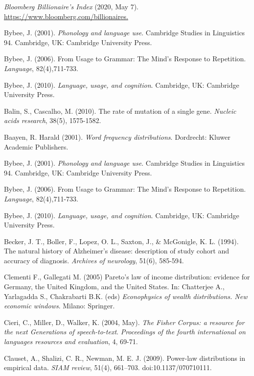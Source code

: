 \documentclass[12pt]{article}
\begin{document}
\begin{thebibliography}{50}

\emph{Bloomberg Billionaire's Index} (2020, May 7). \\
\url{https://www.bloomberg.com/billionaires.} 

Bybee, J. (2001).  \emph{Phonology and language use}. Cambridge Studies in Linguistics 94. Cambridge, UK: Cambridge University Press.

Bybee, J. (2006).  From Usage to Grammar: The Mind's Response to Repetition. \emph{Language}, 82(4),711-733.

Bybee, J. (2010).  \emph{Language, usage, and cognition}. Cambridge, UK: Cambridge University Press.

Balin, S., Cascalho, M. (2010). The rate of mutation of a single gene. \emph{Nucleic acids research}, 38(5), 1575-1582.

Baayen, R. Harald (2001).  \emph{Word frequency distributions}. Dordrecht: Kluwer Academic Publishers.

Bybee, J. (2001).  \emph{Phonology and language use}. Cambridge Studies in Linguistics 94. Cambridge, UK: Cambridge University Press.

Bybee, J. (2006).  From Usage to Grammar: The Mind's Response to Repetition. \emph{Language}, 82(4),711-733.

Bybee, J. (2010).  \emph{Language, usage, and cognition}. Cambridge, UK: Cambridge University Press.

Becker, J. T., Boller, F., Lopez, O. L., Saxton, J., \& McGonigle, K. L. (1994). The natural history of Alzheimer's disease: description of study cohort and accuracy of diagnosis. \emph{Archives of neurology}, 51(6), 585-594.

Clementi F., Gallegati M. (2005) Pareto’s law of income distribution: evidence for Germany, the United Kingdom, and the United States. In: Chatterjee A., Yarlagadda S., Chakrabarti B.K. (eds) \emph{Econophysics of wealth distributions. New economic windows}. Milano: Springer.

Cieri, C., Miller, D., Walker, K. (2004, May). \emph{The Fisher Corpus: a resource for the next Generations of speech-to-text}. \emph{Proceedings of the fourth international on languages resources and evaluation}, 4, 69-71. 

Clauset, A., Shalizi, C. R., Newman, M. E. J. (2009). Power-law distributions in empirical data. \emph{SIAM review}, 51(4), 661–703. doi:10.1137/070710111.


\end{thebibliography}
\end{document}
